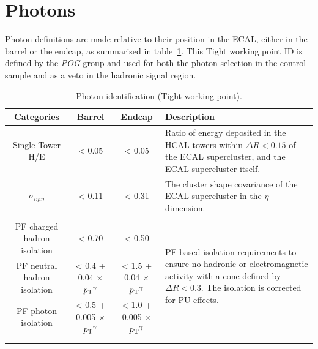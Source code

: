 \section{Photons}  %
\label{sec:objects_photons}

Photon definitions are made relative to their position in the ECAL,
either
in the barrel or the endcap, as summarised in table~\ref{tab:photon-id-egamma}. 
This Tight working point ID is defined by the \emph{POG} group
\cite{ref:photonidtwiki} and used for both the photon
selection in the \gj control sample and as a veto in the hadronic signal region.

\begin{table}[ht!]
  \caption{Photon identification (Tight working point).\label{tab:photon-id-egamma}}
  \centering
  \scriptsize
  \begin{tabular}{ cccp{4.4cm} }
    \hline
    \hline
    Categories                    & Barrel                             & Endcap
    & Description                         \\
    \hline
    Single Tower H/E              & < 0.05                               & < 0.05                               
    & Ratio of energy deposited in the HCAL towers within $\Delta R<0.15$ of the ECAL 
    supercluster, and the ECAL supercluster itself. \\
    $\sigma_{i\eta i\eta}$        & < 0.11                               & < 0.31 & 
    The cluster shape covariance of the ECAL supercluster in the $\eta$
    dimension. \\
    &&&\multirow{4}{4.4cm}{PF-based isolation requirements to ensure no hadronic
    or electromagnetic 
    activity with a cone defined by $\Delta R < 0.3$. The isolation is
    corrected for PU effects.}\\
    PF charged hadron isolation   & < 0.70                               & < 0.50                               & \\
    PF neutral hadron isolation   & < 0.4 + 0.04 $\times$ ${p_{\text T}}^{\gamma}$  & < 1.5 + 0.04 $\times$ ${p_{\text T}}^{\gamma}$&
    \\
    PF photon isolation           & < 0.5 + 0.005 $\times$ ${p_{\text T}}^{\gamma}$ & < 1.0 + 0.005 $\times$ ${p_{\text T}}^{\gamma}$& \\
    \\
    \\
    \hline
    \hline
  \end{tabular}
\end{table}

